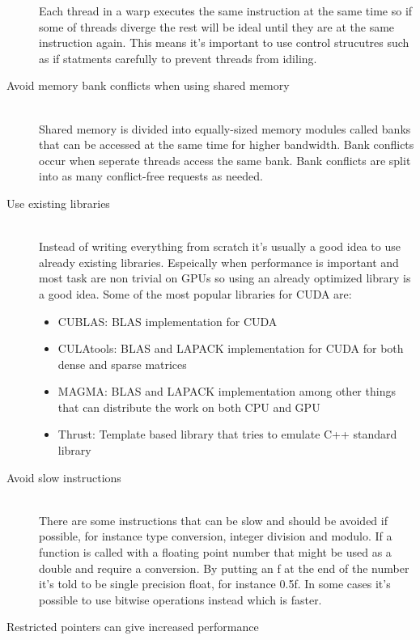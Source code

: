 \documentclass[10pt,a4paper]{article}
\begin{document}
\begin{description}
  Each thread in a warp executes the same instruction at the same time so if some of threads diverge the rest will be ideal until they are at the same instruction again. This means it's important to use control strucutres such as if statments carefully to prevent threads from idiling.\cite{cuda, cuda_best_practice}
  \item[Avoid memory bank conflicts when using shared memory] \hfill \\
  Shared memory is divided into equally-sized memory modules called banks that can be accessed at the same time for higher bandwidth. Bank conflicts occur when seperate threads access the same bank. Bank conflicts are split into as many conflict-free requests as needed.\cite{cuda, cuda_best_practice}
  \item[Use existing libraries] \hfill \\
  Instead of writing everything from scratch it's usually a good idea to use already existing libraries. Espeically when performance is important and most task are non trivial on GPUs so using an already optimized library is a good idea. Some of the most popular libraries for CUDA are:
  \begin{itemize}
    \item CUBLAS: BLAS implementation for CUDA\cite{cublas}
    \item CULAtools: BLAS and LAPACK implementation for CUDA for both dense and sparse matrices\cite{culatools}
    \item MAGMA: BLAS and LAPACK implementation among other things that can distribute the work on both CPU and GPU\cite{magma_2010}
    \item Thrust: Template based library that tries to emulate C++ standard library\cite{thrust_gpu}
  \end{itemize}
  \item[Avoid slow instructions] \hfill \\
  There are some instructions that can be slow and should be avoided if possible, for instance type conversion, integer division and modulo. If a function is called with a floating point number that might be used as a double and require a conversion. By putting an f at the end of the number it's told to be single precision float, for instance 0.5f. In some cases it's possible to use bitwise operations instead which is faster.\cite{cuda, cuda_best_practice}
  \item[Restricted pointers can give increased performance] \hfill \\

\end{description}
\end{document}
